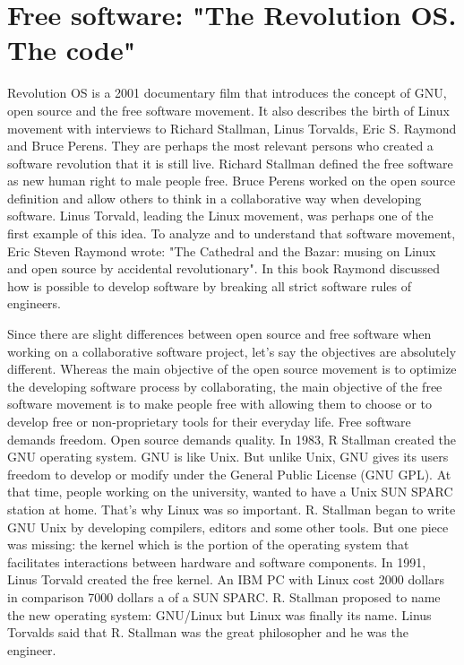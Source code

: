  
   
   
    
     
    
    
   
\section*{Free software: "The Revolution OS. The code"}
 Revolution OS is a 2001 documentary film that introduces the concept of GNU, 
 open source and the free software movement. It also describes the birth of Linux movement
 with  interviews to  Richard Stallman, Linus Torvalds, 
 Eric S. Raymond and Bruce Perens.
 They are perhaps the most relevant persons who created a software revolution that it is still live.  
 Richard Stallman defined the free software as new human right to male people free. 
 Bruce Perens worked on the open source definition and allow others to think in a collaborative way when 
 developing software. Linus Torvald,  leading the Linux movement, was perhaps one of the first example of this idea. 
 To analyze and to understand that software movement, Eric Steven Raymond wrote: "The Cathedral and the Bazar: 
 musing on Linux and open source by accidental revolutionary". 
 In this book Raymond discussed  how is possible to develop software by breaking all strict software rules of engineers.  
 
 Since there are slight differences between open source and free software when working on a collaborative
 software project,  let's say the objectives are absolutely different.  Whereas the main objective of the open source 
 movement is to optimize the developing software process by collaborating, the main objective of 
 the free software movement is to make people free with allowing them to choose or to develop free or non-proprietary
 tools for their everyday life.  Free software demands freedom. Open source demands quality. 
 In 1983, R Stallman created the GNU operating system. 
 GNU is like Unix. But unlike Unix, GNU gives its users freedom to develop or modify 
 under the  General Public License (GNU GPL).
 At that time, people working on the university, wanted to have a Unix SUN SPARC station at home. That's why Linux was so important. 
 R. Stallman  began to write GNU Unix by developing compilers, editors and some other tools. But one piece was missing: the kernel which is 
 the portion of the operating system that facilitates interactions between hardware and software components.  In 1991, Linus Torvald created 
 the free kernel. 
 An IBM PC with Linux cost 2000 dollars  in comparison  7000 dollars a of a SUN SPARC. 
 R. Stallman proposed to name the new operating system:  GNU/Linux  but Linux was finally its name.  
 Linus Torvalds said that R. Stallman was the great philosopher and he was the engineer. 
 
